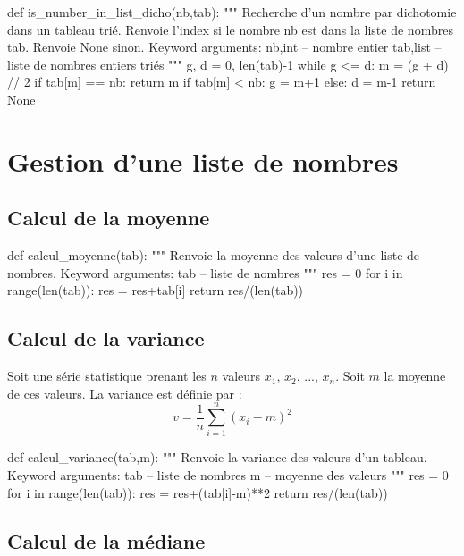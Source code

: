 \documentclass[10pt]{article}
\begin{document}
\begin{py}
\begin{python}
def is_number_in_list_dicho(nb,tab):
    """ 
    Recherche d'un nombre par dichotomie dans un tableau trié. 
    Renvoie l'index si le nombre nb est dans la liste de nombres tab.
    Renvoie None sinon.
    Keyword arguments:
    nb,int -- nombre entier
    tab,list -- liste de nombres entiers triés
    """
    g, d = 0, len(tab)-1
    while g <= d:
        m = (g + d) // 2
        if tab[m] == nb:
            return m
        if tab[m] < nb:
            g = m+1
        else:
            d = m-1
    return None
\end{python}
\end{py}
\section{Gestion d'une liste de nombres}
\subsection{Calcul de la moyenne}
\begin{py}
\begin{python}
def calcul_moyenne(tab):
    """ 
    Renvoie la moyenne des valeurs d'une liste de nombres.
    Keyword arguments:
    tab -- liste de nombres
    """
    res = 0
    for i in range(len(tab)):
        res = res+tab[i]
    return res/(len(tab))
\end{python}
\end{py}    
\subsection{Calcul de la variance}
Soit une série statistique prenant les $n$ valeurs $x_1$, $x_2$, ..., $x_n$. Soit $m$ la moyenne de ces valeurs. La variance est définie par :
$$
v = \dfrac{1}{n} \sum\limits_{i=1}^n\left(x_i - m \right)^2
$$
\begin{py}
\begin{python}
def calcul_variance(tab,m):
    """ 
    Renvoie la variance des valeurs d'un tableau.
    Keyword arguments:
    tab -- liste de nombres
    m -- moyenne des valeurs
    """
    res = 0
    for i in range(len(tab)):
        res = res+(tab[i]-m)**2
    return res/(len(tab))
\end{python}
\end{py}
\subsection{Calcul de la médiane} %
\end{document}
